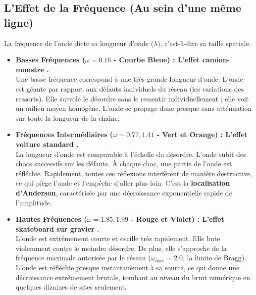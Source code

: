 \documentclass[11pt,a4paper]{article}
\begin{document}
\subsection{L'Effet de la Fréquence (Au sein d'une même ligne)}
La fréquence de l'onde dicte sa longueur d'onde ($\lambda$), c'est-à-dire sa taille spatiale.
\begin{itemize}
    \item \textbf{Basses Fréquences ($\omega = 0.16$ - Courbe Bleue) : \og  L'effet camion-monstre \fg{}.} \\
    Une basse fréquence correspond à une très grande longueur d'onde. L'onde est géante par rapport aux défauts individuels du réseau (les variations des ressorts). Elle \og  survole \fg{} le désordre sans le ressentir individuellement ; elle voit un milieu moyen homogène. L'onde se propage donc presque sans atténuation sur toute la longueur de la chaîne.
    
    \item \textbf{Fréquences Intermédiaires ($\omega = 0.77, 1.41$ - Vert et Orange) : \og  L'effet voiture standard \fg{}.} \\
    La longueur d'onde est comparable à l'échelle du désordre. L'onde subit des chocs successifs sur les défauts. À chaque choc, une partie de l'onde est réfléchie. Rapidement, toutes ces réflexions interfèrent de manière destructive, ce qui piège l'onde et l'empêche d'aller plus loin. C'est la \textbf{localisation d'Anderson}, caractérisée par une décroissance exponentielle rapide de l'amplitude.
    
    \item \textbf{Hautes Fréquences ($\omega = 1.85, 1.99$ - Rouge et Violet) : \og  L'effet skateboard sur gravier \fg{}.} \\
    L'onde est extrêmement courte et oscille très rapidement. Elle bute violemment contre le moindre désordre. De plus, elle s'approche de la fréquence maximale autorisée par le réseau ($\omega_{\text{max}} = 2.0$, la limite de Bragg). L'onde est réfléchie presque instantanément à sa source, ce qui donne une décroissance extrêmement brutale, tombant au niveau du bruit numérique en quelques dizaines de sites seulement.
\end{itemize}
\end{document}
